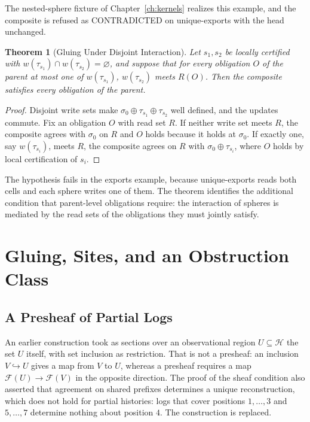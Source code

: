 \documentclass[12pt,oneside,openany]{book}
\theoremstyle{spherepop}
\newtheorem{theorem}[definition]{Theorem}
\theoremstyle{remarkstyle}
\newcommand{\calH}{\mathcal{H}}
\begin{document}
The nested-sphere fixture of Chapter~\ref{ch:kernels} realizes this example, and the composite is refused as \textsf{CONTRADICTED} on \textsf{unique-exports} with the head unchanged.

\begin{theorem}[Gluing Under Disjoint Interaction]
\label{thm:gluing}
Let $s_1,s_2$ be locally certified with $w(\tau_{s_1})\cap w(\tau_{s_2})=\varnothing$, and suppose that for every obligation $O$ of the parent at most one of $w(\tau_{s_1})$, $w(\tau_{s_2})$ meets $R(O)$. Then the composite satisfies every obligation of the parent.
\end{theorem}

\begin{proof}
Disjoint write sets make $\sigma_0\oplus\tau_{s_1}\oplus\tau_{s_2}$ well defined, and the updates commute. Fix an obligation $O$ with read set $R$. If neither write set meets $R$, the composite agrees with $\sigma_0$ on $R$ and $O$ holds because it holds at $\sigma_0$. If exactly one, say $w(\tau_{s_i})$, meets $R$, the composite agrees on $R$ with $\sigma_0\oplus\tau_{s_i}$, where $O$ holds by local certification of $s_i$.
\end{proof}

The hypothesis fails in the exports example, because \textsf{unique-exports} reads both cells and each sphere writes one of them. The theorem identifies the additional condition that parent-level obligations require: the interaction of spheres is mediated by the read sets of the obligations they must jointly satisfy.

\chapter{Gluing, Sites, and an Obstruction Class}
\label{ch:gluing}

\section{A Presheaf of Partial Logs}

An earlier construction took as sections over an observational region $U\subseteq\calH$ the set $U$ itself, with set inclusion as restriction. That is not a presheaf: an inclusion $V\hookrightarrow U$ gives a map from $V$ to $U$, whereas a presheaf requires a map $\mathscr F(U)\to\mathscr F(V)$ in the opposite direction. The proof of the sheaf condition also asserted that agreement on shared prefixes determines a unique reconstruction, which does not hold for partial histories: logs that cover positions $1,\dots,3$ and $5,\dots,7$ determine nothing about position $4$. The construction is replaced.
\end{document}

